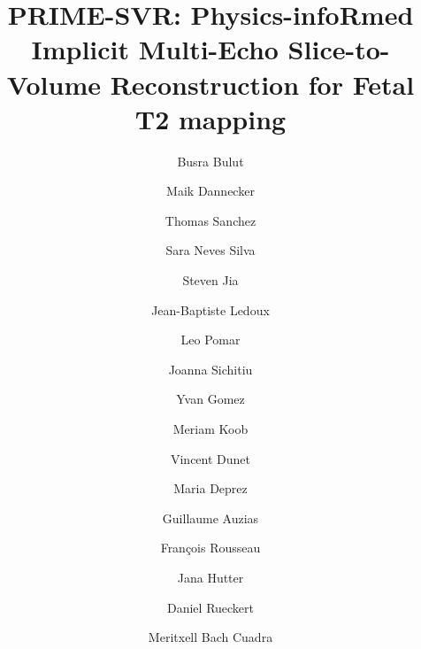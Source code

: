 \documentclass[preprint,authoryear,12pt]{elsarticle}
\begin{document}
\begin{frontmatter}



\title{PRIME-SVR: Physics-infoRmed Implicit Multi-Echo Slice-to-Volume Reconstruction for Fetal T2 mapping}



\author[1,2]{Busra Bulut}

\author[3]{Maik Dannecker}

\author[1,2]{Thomas Sanchez}

\author[6]{Sara Neves Silva}

\author[7]{Steven Jia}

\author[1,2]{Jean-Baptiste Ledoux}
\author[10]{Leo Pomar}
\author[10]{Joanna Sichitiu}
\author[10]{Yvan Gomez}
\author[1]{Meriam Koob}
\author[1]{Vincent Dunet}
\author[6]{Maria Deprez}

\author[7]{Guillaume Auzias}

\author[8]{François Rousseau}

\author[4,9]{Jana Hutter}

\author[3,4,5]{Daniel Rueckert}

\author[1,2]{Meritxell Bach Cuadra}


\end{frontmatter}
\end{document}
